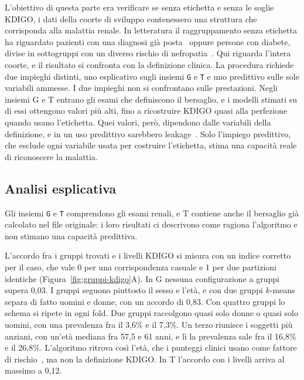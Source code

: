 \documentclass[a4paper, 12pt, oneside]{book}
\begin{document}
L'obiettivo di questa parte era verificare se senza etichetta e senza le soglie KDIGO, i dati della coorte di sviluppo contenessero una struttura che corrisponda alla malattia renale. In letteratura il raggruppamento senza etichetta ha riguardato pazienti con una diagnosi già posta~\cite{zheng_subtyping_2021} oppure persone con diabete, divise in sottogruppi con un diverso rischio di nefropatia~\cite{ahlqvist_novel_2018}. Qui riguarda l'intera coorte, e il risultato si confronta con la definizione clinica. La procedura richiede due impieghi distinti, uno esplicativo sugli insiemi \texttt{G} e \texttt{T} e uno predittivo sulle sole variabili ammesse. I due impieghi non si confrontano sulle prestazioni. Negli insiemi G e T entrano gli esami che definiscono il bersaglio, e i modelli stimati su di essi ottengono valori più alti, fino a ricostruire KDIGO quasi alla perfezione quando usano l'etichetta. Quei valori, però, dipendono dalle variabili della definizione, e in un uso predittivo sarebbero leakage~\cite{kapoor_leakage_2023}. Solo l'impiego predittivo, che esclude ogni variabile usata per costruire l'etichetta, stima una capacità reale di riconoscere la malattia.

\subsection{Analisi esplicativa}

Gli insiemi \texttt{G} e \texttt{T} comprendono gli esami renali, e T contiene anche il bersaglio già calcolato nel file originale: i loro risultati ci descrivono come ragiona l'algoritmo e non stimano una capacità predittiva.

L'accordo fra i gruppi trovati e i livelli KDIGO si misura con un indice corretto per il caso, che vale 0 per una corrispondenza casuale e 1 per due partizioni identiche (Figura~\ref{fig:gruppi-kdigo}A). In G nessuna configurazione a gruppi supera 0,03. I  gruppi seguono piuttosto il sesso e l'età, e con due gruppi $k$-means~\cite{lloyd_least_1982} separa di fatto uomini e donne, con un accordo di 0,83. Con quattro gruppi lo schema si ripete in ogni fold. Due gruppi raccolgono quasi solo donne o quasi solo uomini, con una prevalenza fra il 3,6\% e il 7,3\%. Un terzo riunisce i soggetti più anziani, con un'età mediana fra 57,5 e 61 anni, e lì la prevalenza sale fra il 16,8\% e il 26,8\%. L'algoritmo ritrova così l'età, che i punteggi clinici usano come fattore di rischio~\cite{bang_screening_2007}, ma non la definizione KDIGO. In T l'accordo con i livelli arriva al massimo a 0,12.
\end{document}
